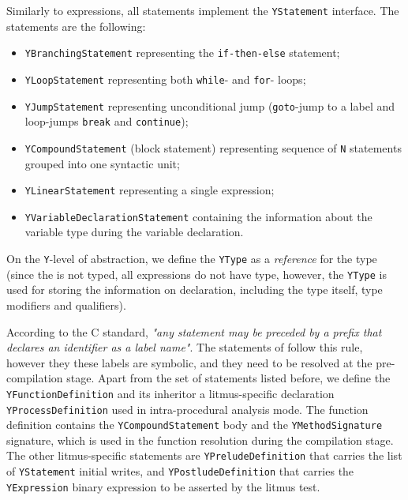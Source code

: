 Similarly to expressions, all \ytree{} statements implement the \texttt{YStatement} interface. The statements are the following: 

\begin{itemize}%
  \item \texttt{YBranchingStatement} representing the \texttt{if-then-else} statement;
  
  \item \texttt{YLoopStatement} representing both \texttt{while}- and \texttt{for}- loops;%
  
  \item \texttt{YJumpStatement} representing unconditional jump (\texttt{goto}-jump to a label and loop-jumps \texttt{break} and \texttt{continue});
  
  \item \texttt{YCompoundStatement} (block statement) representing sequence of \texttt{N} statements grouped into one syntactic unit;
  
  \item \texttt{YLinearStatement} representing a single expression;
  
  \item \texttt{YVariableDeclarationStatement} containing the information about the variable type during the variable declaration.
\end{itemize}

On the \texttt{Y}-level of abstraction, we define the \texttt{YType} as a \textit{reference} for the type (since the \ytree{} is not typed, all expressions do not have type, however, the \texttt{YType} is used for storing the information on declaration, including the type itself, type modifiers and qualifiers).

According to the C standard, \textit{"any statement may be preceded by a prefix that declares an identifier as a label name"}.
The \ytree{} statements of follow this rule, however they these labels are symbolic, and they need to be resolved at the pre-compilation stage.
Apart from the set of statements listed before, we define the \texttt{YFunctionDefinition} and its inheritor a litmus-specific declaration \texttt{YProcessDefinition}
used in intra-procedural analysis mode.
The function definition contains the \texttt{YCompoundStatement} body and the \texttt{YMethodSignature} signature, which is used in the function resolution during the compilation stage. %
The other litmus-specific statements are \texttt{YPreludeDefinition}
that carries the list of \texttt{YStatement} initial writes, and \texttt{YPostludeDefinition} 
that carries the \texttt{YExpression} binary expression to be asserted by the litmus test.

